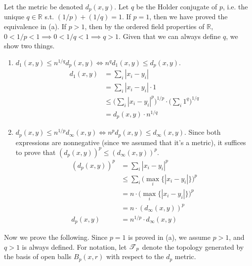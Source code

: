   \begin{solution}[Munkres 20.1.b]
    Let the metric be denoted $d_p (x, y)$. Let $q$ be the Holder conjugate of $p$, i.e. the unique $q \in \mathbb{R}$ s.t. $(1/p) + (1/q) = 1$. If $p = 1$, then we have proved the equivalence in (a). If $p > 1$, then by the ordered field properties of $\mathbb{R}$, $0 < 1/p < 1 \implies 0 < 1/q < 1 \implies q > 1$. Given that we can always define $q$, we show two things. 
    \begin{enumerate}
      \item $d_1 (x, y) \leq n^{1/q} d_p (x, y) \iff n^q d_1 (x, y) \leq d_p (x, y)$. 
      \begin{align}
        d_1 (x, y) & = \sum_i |x_i - y_i| \\ 
                   & = \sum_i |x_i - y_i| \cdot 1 \\
                   & \leq \bigg( \sum_i |x_i - y_i|^p \bigg)^{1/p} \cdot \bigg(\sum_i 1^q \bigg)^{1/q} \\
                   & = d_p (x, y) \cdot n^{1/q}
      \end{align} 

      \item $d_p (x, y) \leq n^{1/p} d_\infty (x, y) \iff n^p d_p (x, y) \leq d_\infty (x, y)$. Since both expressions are nonnegative (since we assumed that it's a metric), it suffices to prove that $(d_p (x, y))^p \leq (d_\infty (x, y))^{p}$. 
      \begin{align}
        (d_p(x, y))^p & = \sum_i |x_i - y_i|^p \\
                      & \leq \sum_i \big( \max_i \{ |x_i - y_i| \} \big)^p \\
                      & = n \cdot \big( \max_i \{ |x_i - y_i| \} \big)^p \\ 
                      & = n \cdot (d_\infty (x, y))^p \\
        d_p(x, y)     & = n^{1/p} \cdot d_\infty (x, y)
      \end{align}
    \end{enumerate} 
    Now we prove the following. Since $p = 1$ is proved in (a), we assume $p > 1$, and $q > 1$ is always defined. For notation, let $\T_p$ denote the topology generated by the basis of open balls $B_p (x, r)$ with respect to the $d_p$ metric. 


\end{solution}
